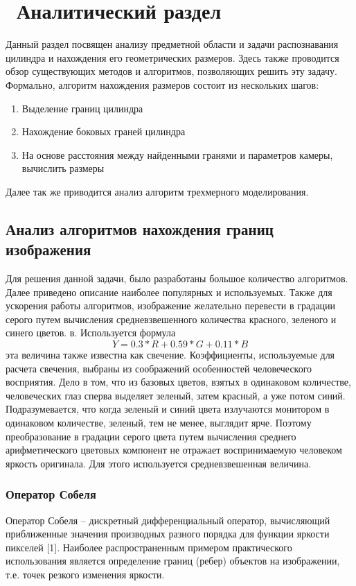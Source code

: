 \chapter{ Аналитический раздел }
Данный раздел посвящен анализу предметной области и задачи распознавания цилиндра и нахождения его геометрических размеров. Здесь также проводится обзор существующих методов и алгоритмов, позволяющих решить эту задачу.
Формально, алгоритм нахождения размеров состоит из нескольких шагов:
\begin{enumerate}
	\item Выделение границ цилиндра 
	\item Нахождение боковых граней цилиндра 
	\item На основе расстояния между найденными гранями и параметров камеры, вычислить размеры 
\end{enumerate}

Далее так же приводится анализ алгоритм трехмерного моделирования.

\section{ Анализ алгоритмов нахождения границ изображения }
Для решения данной задачи, было разработаны большое количество алгоритмов. Далее приведено описание наиболее популярных и используемых.
Также для ускорения работы алгоритмов, изображение желательно перевести в градации серого путем вычисления средневзвешенного количества красного, зеленого и синего цветов. в. Используется формула
\[Y = 0.3*R + 0.59*G + 0.11*B\]
эта величина также известна как свечение. Коэффициенты, используемые для расчета свечения, выбраны из соображений особенностей человеческого восприятия. Дело в том, что из базовых цветов, взятых в одинаковом количестве, человеческих глаз сперва выделяет зеленый, затем красный, а уже потом синий. Подразумевается, что когда зеленый и синий цвета излучаются монитором в одинаковом количестве, зеленый, тем не менее, выглядит ярче. Поэтому преобразование в градации серого цвета путем вычисления среднего арифметического цветовых компонент не отражает воспринимаемую человеком яркость оригинала. Для этого используется средневзвешенная величина.


\subsection{Оператор Собеля}
\label {sobel}
Оператор Собеля – дискретный дифференциальный оператор, вычисляющий приближенные значения производных разного порядка для функции яркости пикселей [1]. Наиболее распространенным примером практического использования является определение границ (ребер) объектов на изображении, т.е. точек резкого изменения яркости.

